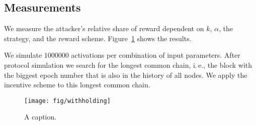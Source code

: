 \documentclass{article}
\begin{document}
\subsection{Measurements}

We measure the attacker's relative share of reward dependent on $k$, $\alpha$, the strategy, and the reward scheme.
Figure~\ref{fig:withholding} shows the results.

We simulate $1 000 000$ activations per combination of input parameters.
After protocol simulation we search for the longest common chain, i.\,e., the block with the biggest epoch number that is also in the history of all nodes.
We apply the incentive scheme to this longest common chain.

\begin{figure}
  \texttt{[image: fig/withholding]}
  \caption{
    A caption.
  }
  \label{fig:withholding}
\end{figure}
\end{document}
